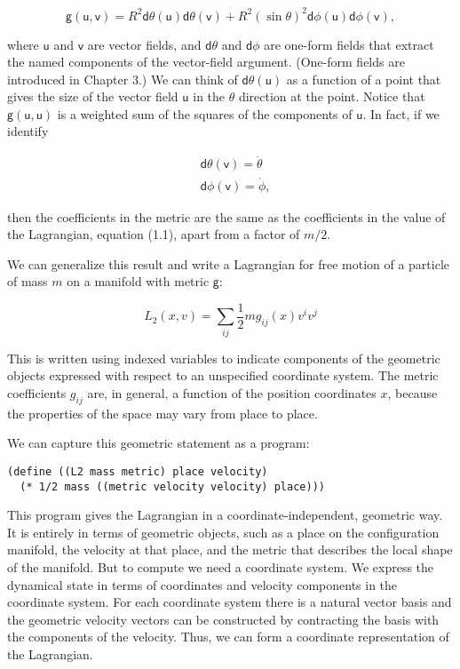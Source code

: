 \documentclass[11pt]{article}
\begin{document}
\begin{equation}
\mathsf{g}(\mathsf{u}, \mathsf{v})=R^{2} \mathsf{d} \theta(\mathsf{u})
\mathsf{d} \theta(\mathsf{v})+R^{2}(\sin \theta)^{2} \mathsf{d}
\phi(\mathsf{u}) \mathsf{d} \phi(\mathsf{v}),
\end{equation}

where \(\mathsf{u}\) and \(\mathsf{v}\) are vector fields, and \(\mathsf{d}\theta\)
and \(\mathsf{d}\phi\) are one-form fields that extract the named components of
the vector-field argument. (One-form fields are introduced in Chapter 3.) We
can think of \(\mathsf{d}\theta(\mathsf{u})\) as a function of a point that
gives the size of the vector field \(\mathsf{u}\) in the \(\theta\) direction at
the point. Notice that \(\mathsf{g}(\mathsf{u}, \mathsf{u})\) is a weighted sum
of the squares of the components of \(\mathsf{u}\). In fact, if we identify

\begin{align*}
&\mathsf{d} \theta(\mathsf{v})=\dot{\theta} \\
&\mathsf{d} \phi(\mathsf{v})=\dot{\phi},
\end{align*}

then the coefficients in the metric are the same as the coefficients in the
value of the Lagrangian, equation (1.1), apart from a factor of \(m/2\).

We can generalize this result and write a Lagrangian for free motion of a
particle of mass \(m\) on a manifold with metric \(\mathsf{g}\):

\begin{equation}
L_{2}(x, v)=\sum_{i j} \frac{1}{2} m g_{i j}(x) v^{i} v^{j}
\end{equation}

This is written using indexed variables to indicate components of the
geometric objects expressed with respect to an unspecified coordinate system.
The metric coefficients \(g_{ij}\) are, in general, a function of the position
coordinates \(x\), because the properties of the space may vary from place to
place.

We can capture this geometric statement as a program:

\begin{verbatim}
(define ((L2 mass metric) place velocity)
  (* 1/2 mass ((metric velocity velocity) place)))
\end{verbatim}

This program gives the Lagrangian in a coordinate-independent, geometric way.
It is entirely in terms of geometric objects, such as a place on the
configuration manifold, the velocity at that place, and the metric that
describes the local shape of the manifold. But to compute we need a
coordinate system. We express the dynamical state in terms of coordinates and
velocity components in the coordinate system. For each coordinate system
there is a natural vector basis and the geometric velocity vectors can be
constructed by contracting the basis with the components of the velocity.
Thus, we can form a coordinate representation of the Lagrangian.
\end{document}
